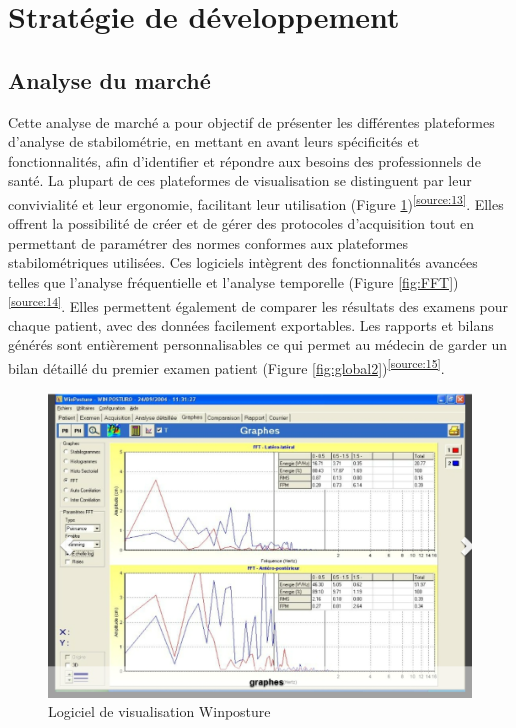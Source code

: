 \section{Stratégie de développement}

\subsection{Analyse du marché}

Cette analyse de marché a pour objectif de présenter les différentes plateformes d'analyse de stabilométrie, en mettant en avant leurs spécificités et fonctionnalités, afin d’identifier et répondre aux besoins des professionnels de santé.
La plupart de ces plateformes de visualisation se distinguent par leur convivialité et leur ergonomie, facilitant leur utilisation (Figure \ref{fig: Logiciel Winposture})\textsuperscript{\ref{source:13}}.
Elles offrent la possibilité de créer et de gérer des protocoles d’acquisition tout en permettant de paramétrer des normes conformes aux plateformes stabilométriques utilisées. 
Ces logiciels intègrent des fonctionnalités avancées telles que l’analyse fréquentielle et l’analyse temporelle (Figure \ref{fig:FFT})\textsuperscript{\ref{source:14}}. 
Elles permettent également de comparer les résultats des examens pour chaque patient, avec des données facilement exportables. 
Les rapports et bilans générés sont entièrement personnalisables ce qui permet au médecin de garder un bilan détaillé du premier examen patient (Figure \ref{fig:global2})\textsuperscript{\ref{source:15}}.

\begin{figure}[ht]
  \centering
  \includegraphics[width=\textwidth]{images/pression_plantaire/winposture2.png}
  \caption{Logiciel de visualisation Winposture}
  \label{fig: Logiciel Winposture}
\end{figure}

